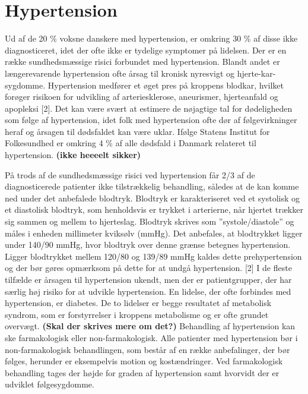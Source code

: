 \section{Hypertension}

Ud af de 20 \% voksne danskere med hypertension, er omkring 30 \% af disse ikke diagnosticeret, idet der ofte ikke er tydelige symptomer på lidelsen. \cite{kronborg2008} 
Der er en række sundhedsmæssige risici forbundet med hypertension. Blandt andet er længerevarende hypertension ofte årsag til kronisk nyresvigt og hjerte-kar-sygdomme. Hypertension medfører et øget pres på kroppens blodkar, hvilket forøger risikoen for udvikling af arteriesklerose, aneurismer, hjerteanfald og apopleksi [2]. Det kan være svært at estimere de nøjagtige tal for dødeligheden som følge af hypertension, idet folk med hypertension ofte dør af følgevirkninger heraf og årsagen til dødsfaldet kan være uklar. Ifølge Statens Institut for Folkesundhed er omkring 4 \% af alle dødsfald i Danmark relateret til hypertension. \cite{juel2006} \textbf{(ikke heeeelt sikker)}
 
På trods af de sundhedsmæssige risici ved hypertension får 2/3 af de diagnosticerede patienter ikke tilstrækkelig behandling, således at de kan komme ned under det anbefalede blodtryk. \cite{paulsen2012}
Blodtryk er karakteriseret ved et systolisk og et diastolisk blodtryk, som henholdsvis er trykket i arterierne, når hjertet trækker sig sammen og mellem to hjerteslag. Blodtryk skrives som ”systole/diastole” og måles i enheden millimeter kviksølv (mmHg). Det anbefales, at blodtrykket ligger under 140/90 mmHg, hvor blodtryk over denne grænse betegnes hypertension. Ligger blodtrykket mellem 120/80 og 139/89 mmHg kaldes dette prehypertension og der bør gøres opmærksom på dette for at undgå hypertension. [2]
I de fleste tilfælde er årsagen til hypertension ukendt, men der er patientgrupper, der har særlig høj risiko for at udvikle hypertension. En lidelse, der ofte forbindes med hypertension, er diabetes. De to lidelser er begge resultatet af metabolisk syndrom, som er forstyrrelser i kroppens metabolisme og er ofte grundet overvægt. \cite{cheung2012} \textbf{(Skal der skrives mere om det?)}
Behandling af hypertension kan ske farmakologisk eller non-farmakologisk. Alle patienter med hypertension bør i non-farmakologisk behandlingen, som består af en række anbefalinger, der bør følges, herunder er eksempelvis motion og kostændringer. Ved farmakologisk behandling tages der højde for graden af hypertension samt hvorvidt der er udviklet følgesygdomme. \cite{lodberg2016}
